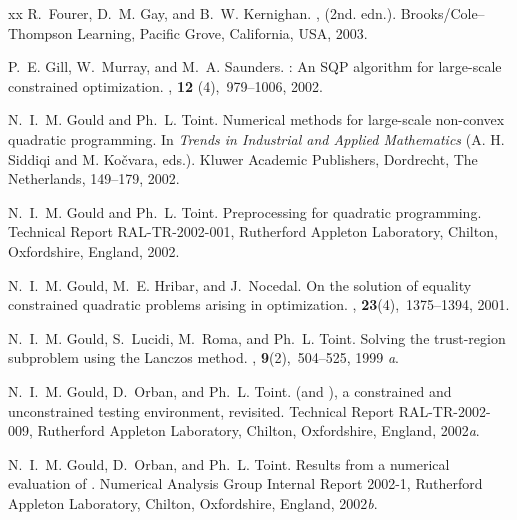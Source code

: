 \documentclass[twoside]{article}
\begin{document}
\begin{thebibliography}{xx}
R.~Fourer, D.~M. Gay, and B.~W. Kernighan.
,
(2nd. edn.).
\newblock Brooks/Cole--Thompson Learning, Pacific Grove, California, USA, 2003.

P.~E. Gill, W.~Murray, and M.~A. Saunders.
: An {SQP} algorithm for large-scale constrained optimization.
, {\bf 12} (4),~979--1006, 2002.

N.~I.~M. Gould and Ph.~L. Toint.
\newblock Numerical methods for large-scale non-convex quadratic programming.
\newblock In {\em Trends in Industrial and Applied Mathematics}
(A. H. Siddiqi and M. Ko\v{c}vara, eds.).
\newblock Kluwer Academic Publishers, Dordrecht, The Netherlands, 149--179, 
2002.

N.~I.~M. Gould and Ph.~L. Toint.
\newblock Preprocessing for quadratic programming.
\newblock Technical Report RAL-TR-2002-001, Rutherford Appleton Laboratory,
  Chilton, Oxfordshire, England, 2002.

N.~I.~M. Gould, M.~E. Hribar, and J.~Nocedal.
\newblock On the solution of equality constrained quadratic problems arising in
  optimization.
, {\bf 23}(4),~1375--1394,
  2001.

N.~I.~M. Gould, S.~Lucidi, M.~Roma, and Ph.~L. Toint.
\newblock Solving the trust-region subproblem using the {L}anczos method.
, {\bf 9}(2),~504--525, 1999{\em
  a}.

N.~I.~M. Gould, D.~Orban, and Ph.~L. Toint.
 (and \rm), a constrained and unconstrained
  testing environment, revisited.
\newblock Technical Report RAL-TR-2002-009, Rutherford Appleton Laboratory,
  Chilton, Oxfordshire, England, 2002{\em a}.

N.~I.~M. Gould, D.~Orban, and Ph.~L. Toint.
\newblock Results from a numerical evaluation of  \rm.
\newblock Numerical Analysis Group Internal Report 2002-1, Rutherford Appleton
  Laboratory, Chilton, Oxfordshire, England, 2002{\em b}.


\end{thebibliography}
\end{document}
